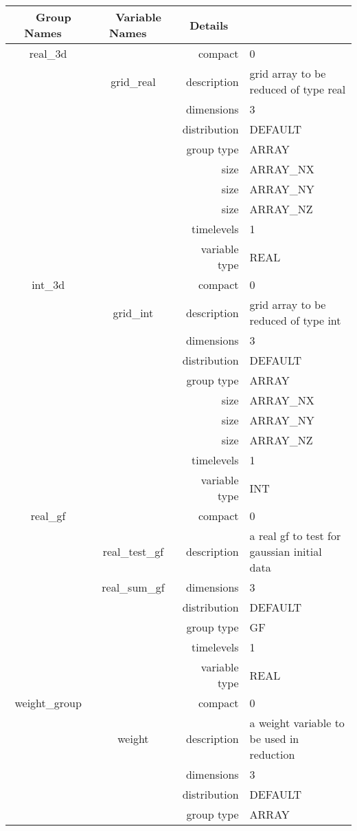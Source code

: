 \begin{tabular*}{150mm}{|c|c@{\extracolsep{\fill}}|rl|} \hline 
~ {\bf Group Names} ~ & ~ {\bf Variable Names} ~  &{\bf Details} ~ & ~\\ 
\hline 
real\_3d &  & compact & 0 \\ 
 & grid\_real & description & grid array to be reduced of type real \\ 
 &  & dimensions & 3 \\ 
 &  & distribution & DEFAULT \\ 
 &  & group type & ARRAY \\ 
 &  & size & ARRAY\_NX \\ 
& ~ & size & ARRAY\_NY \\ 
 &  & size & ARRAY\_NZ \\ 
 &  & timelevels & 1 \\ 
 &  & variable type & REAL \\ 
\hline 
int\_3d &  & compact & 0 \\ 
 & grid\_int & description & grid array to be reduced of type int \\ 
 &  & dimensions & 3 \\ 
 &  & distribution & DEFAULT \\ 
 &  & group type & ARRAY \\ 
 &  & size & ARRAY\_NX \\ 
& ~ & size & ARRAY\_NY \\ 
 &  & size & ARRAY\_NZ \\ 
 &  & timelevels & 1 \\ 
 &  & variable type & INT \\ 
\hline 
real\_gf &  & compact & 0 \\ 
 & real\_test\_gf & description & a real gf to test for gaussian initial data \\ 
 & real\_sum\_gf & dimensions & 3 \\ 
 &  & distribution & DEFAULT \\ 
 &  & group type & GF \\ 
 &  & timelevels & 1 \\ 
 &  & variable type & REAL \\ 
\hline 
weight\_group &  & compact & 0 \\ 
 & weight & description & a weight variable to be used in reduction \\ 
 &  & dimensions & 3 \\ 
 &  & distribution & DEFAULT \\ 
 &  & group type & ARRAY \\ 

\end{tabular*}
